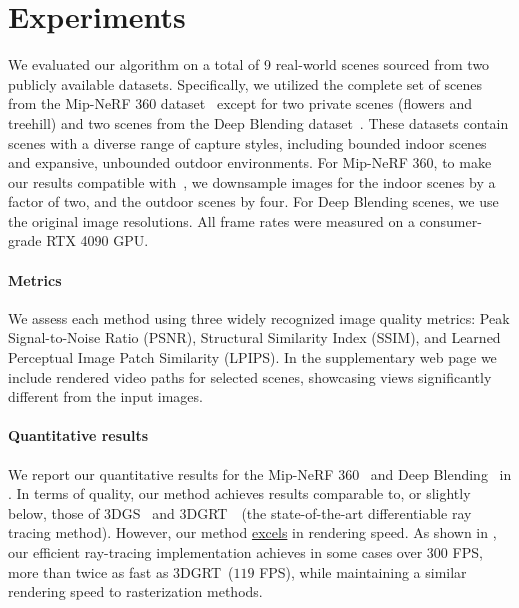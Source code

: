 
\section{Experiments}
\label{sec:experiments}
%
We evaluated our algorithm on a total of 9 real-world scenes sourced from two publicly available datasets. 
Specifically, we utilized the complete set of scenes from the Mip-NeRF 360 dataset~\cite{mipnerf360} except for two private scenes (flowers and treehill) and two scenes from the Deep Blending dataset~\cite{deepblending}.
These datasets contain scenes with a diverse range of capture styles, including bounded indoor scenes and expansive, unbounded outdoor environments.
For Mip-NeRF 360, to make our results compatible with~\cite{gsplat, 3dgrt}, we downsample images for the indoor scenes by a factor of two, and the outdoor scenes by four.
For Deep Blending scenes, we use the original image resolutions.
All frame rates were measured on a consumer-grade RTX 4090 GPU.

\paragraph{Metrics}
We assess each method using three widely recognized image quality metrics: Peak Signal-to-Noise Ratio (PSNR), Structural Similarity Index (SSIM), and Learned Perceptual Image Patch Similarity (LPIPS).
% 
In the supplementary web page we include rendered video paths for selected scenes, showcasing views significantly different from the input images.

\paragraph{Quantitative results}
We report our quantitative results for the Mip-NeRF 360~\cite{mipnerf360} and Deep Blending~\cite{deepblending} in .
In terms of quality, our method achieves results comparable to, or slightly below, those of 3DGS~\cite{gsplat} and 3DGRT~\cite{3dgrt}~(the state-of-the-art differentiable ray tracing method).
However, our method \ul{excels} in rendering speed. 
As shown in , our efficient ray-tracing implementation achieves in some cases over 300 FPS, more than twice as fast as 3DGRT~($119$ FPS), while maintaining a similar rendering speed to rasterization methods.


